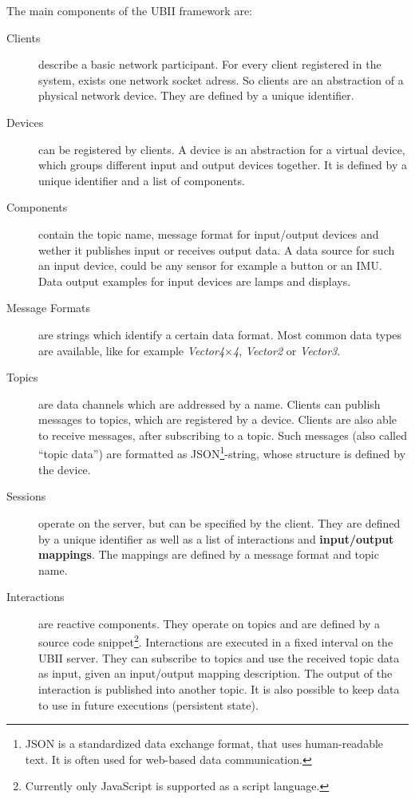 The main components of the \ac{UBII} framework are:
\begin{description}
	\item[Clients] describe a basic network participant. For every client registered in the system, exists one network socket adress. So clients are an abstraction of a physical network device. They are defined by a unique identifier. 
	\item[Devices] can be registered by clients. A device is an abstraction for a virtual device, which groups different input and output devices together. It is defined by a unique identifier and a list of components.
  \item[Components] contain the topic name, message format for input/output devices and wether it publishes input or receives output data. A data source for such an input device, could be any sensor for example a button or an \ac{IMU}. Data output examples for input devices are lamps and displays.
  \item[Message Formats] are strings which identify a certain data format. Most common data types are available, like for example \textit{Vector4\( \times \)4}, \textit{Vector2} or \textit{Vector3}.
	\item[Topics] are data channels which are addressed by a name. Clients can publish messages to topics, which are registered by a device. Clients are also able to receive messages, after subscribing to a topic. Such messages (also called \enquote{topic data}) are formatted as JSON\footnote{JSON is a standardized data exchange format, that uses human-readable text. It is often used for web-based data communication.}-string, whose structure is defined by the device.
	\item[Sessions] operate on the server, but can be specified by the client. They are defined by a unique identifier as well as a list of interactions and \textbf{input/output mappings}. The mappings are defined by a message format and topic name.
	\item[Interactions] are reactive components. They operate on topics and are defined by a source code snippet\footnote{Currently only JavaScript is supported as a script language.}. Interactions are executed in a fixed interval on the \ac{UBII} server. They can subscribe to topics and use the received topic data as input, given an input/output mapping description. The output of the interaction is published into another topic. It is also possible to keep data to use in future executions (persistent state).
\end{description}

